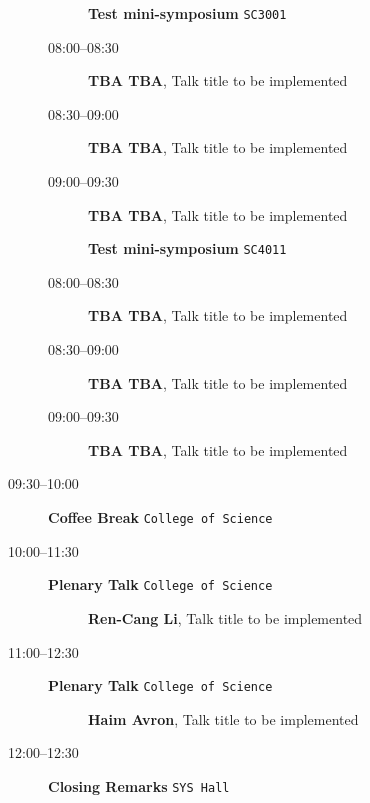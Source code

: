 \documentclass[ILAS2025-program.tex]{subfiles}
\begin{document}
\begin{description}
\begin{description}
        \end{description}
    \begin{description}
    \item[] \textbf{Test mini-symposium} {\footnotesize\texttt{SC3001}}
    \item[08:00--08:30] \textbf{TBA TBA}, Talk title to be implemented
        \item[08:30--09:00] \textbf{TBA TBA}, Talk title to be implemented
        \item[09:00--09:30] \textbf{TBA TBA}, Talk title to be implemented
        \end{description}
    \begin{description}
    \item[] \textbf{Test mini-symposium} {\footnotesize\texttt{SC4011}}
    \item[08:00--08:30] \textbf{TBA TBA}, Talk title to be implemented
        \item[08:30--09:00] \textbf{TBA TBA}, Talk title to be implemented
        \item[09:00--09:30] \textbf{TBA TBA}, Talk title to be implemented
        \end{description}
    \item[09:30--10:00] \textbf{Coffee Break} {\footnotesize\texttt{College of Science}}
    \item[10:00--11:30] \textbf{Plenary Talk} {\footnotesize\texttt{College of Science}}
    \begin{description}
        \item[] \textbf{Ren-Cang Li}, Talk title to be implemented
        \end{description}
        \item[11:00--12:30] \textbf{Plenary Talk} {\footnotesize\texttt{College of Science}}
    \begin{description}
        \item[] \textbf{Haim Avron}, Talk title to be implemented
        \end{description}
        \item[12:00--12:30] \textbf{Closing Remarks} {\footnotesize\texttt{SYS Hall}}
    \end{description}
    \newpage
\end{document}

